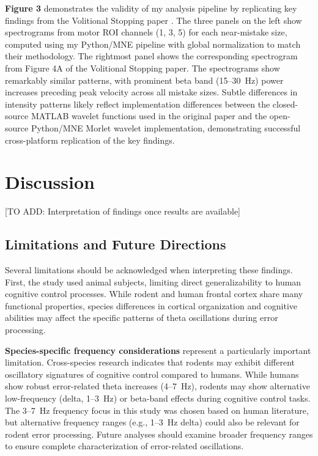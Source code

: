 \documentclass[11pt]{article}
\begin{document}
\textbf{Figure 3} demonstrates the validity of my analysis pipeline by replicating key findings from the Volitional Stopping paper \citep{doutel2024volitional}. The three panels on the left show spectrograms from motor ROI channels (1, 3, 5) for each near-mistake size, computed using my Python/MNE pipeline with global normalization to match their methodology. The rightmost panel shows the corresponding spectrogram from Figure 4A of the Volitional Stopping paper. The spectrograms show remarkably similar patterns, with prominent beta band (15--30~Hz) power increases preceding peak velocity across all mistake sizes. Subtle differences in intensity patterns likely reflect implementation differences between the closed-source MATLAB wavelet functions used in the original paper and the open-source Python/MNE Morlet wavelet implementation, demonstrating successful cross-platform replication of the key findings.

\section{Discussion}

[TO ADD: Interpretation of findings once results are available]

\subsection{Limitations and Future Directions}

Several limitations should be acknowledged when interpreting these findings. First, the study used animal subjects, limiting direct generalizability to human cognitive control processes. While rodent and human frontal cortex share many functional properties, species differences in cortical organization and cognitive abilities may affect the specific patterns of theta oscillations during error processing.

\textbf{Species-specific frequency considerations} represent a particularly important limitation. Cross-species research indicates that rodents may exhibit different oscillatory signatures of cognitive control compared to humans. While humans show robust error-related theta increases (4--7~Hz), rodents may show alternative low-frequency (delta, 1--3~Hz) or beta-band effects during cognitive control tasks. The 3--7~Hz frequency focus in this study was chosen based on human literature, but alternative frequency ranges (e.g., 1--3~Hz delta) could also be relevant for rodent error processing. Future analyses should examine broader frequency ranges to ensure complete characterization of error-related oscillations.
\end{document}
